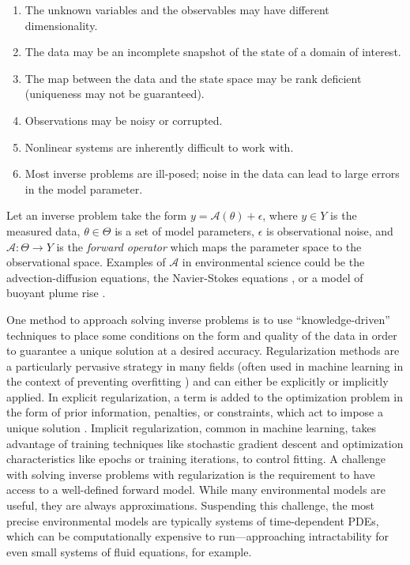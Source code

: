 \begin{enumerate}
	\item The unknown variables and the observables may have different dimensionality.
	\item The data may be an incomplete snapshot of the state of a domain of interest.
	\item The map between the data and the state space may be rank deficient (uniqueness may not be guaranteed).
	\item Observations may be noisy or corrupted.
	\item Nonlinear systems are inherently difficult to work with.
	\item Most inverse problems are ill-posed; noise in the data can lead to large errors in the model parameter.
\end{enumerate}

Let an inverse problem take the form $y = \mathcal{A}(\theta) + \epsilon$, where $y \in Y$ is the measured data, $\theta \in \Theta$ is a set of model parameters, $\epsilon$ is observational noise, and $\mathcal{A} : \Theta \longrightarrow Y$ is the \emph{forward operator} which maps the parameter space to the observational space. Examples of $\mathcal{A}$ in environmental science could be the advection-diffusion equations, the Navier-Stokes equations \autocite{euler1757principes,182navier2lois,stokes1851effect}, or a model of buoyant plume rise \autocite{speer1989model,lavelle2013turbulent}.

One method to approach solving inverse problems is to use ``knowledge-driven'' techniques to place some conditions on the form and quality of the data in order to guarantee a unique solution at a desired accuracy. Regularization methods are a particularly pervasive strategy in many fields (often used in machine learning in the context of preventing overfitting \autocite{srivastava2014dropout}) and can either be explicitly or implicitly applied. In explicit regularization, a term is added to the optimization problem in the form of prior information, penalties, or constraints, which act to impose a unique solution \autocite{engl1996regularization,benning2018modern,iglesias2013ensemble}. Implicit regularization, common in machine learning, takes advantage of training techniques like stochastic gradient descent \autocite{bottou2010large,amari1993backpropagation} and optimization characteristics like epochs or training iterations, to control fitting. A challenge with solving inverse problems with regularization is the requirement to have access to a well-defined forward model. While many environmental models are useful, they are always approximations. Suspending this challenge, the most precise environmental models are typically systems of time-dependent PDEs, which can be computationally expensive to run---approaching intractability for even small systems of fluid equations, for example.

